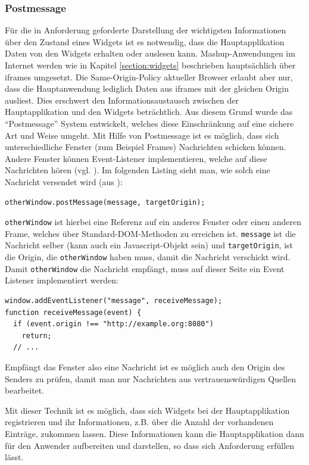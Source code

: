\subsubsection*{Postmessage}
Für die in Anforderung  geforderte Darstellung der wichtigsten Informationen über den Zustand eines Widgets ist es notwendig, dass die Hauptapplikation Daten von den Widgets erhalten oder auslesen kann. Mashup-Anwendungen im Internet werden wie in Kapitel \ref{section:widgets} beschrieben hauptsächlich über iframes umgesetzt. Die Same-Origin-Policy aktueller Browser erlaubt aber nur, dass die Hauptanwendung lediglich Daten aus iframes mit der gleichen Origin ausliest. Dies erschwert den Informationsaustausch zwischen der Hauptapplikation und den Widgets beträchtlich. Aus diesem Grund wurde das "`Postmessage"' System entwickelt, welches diese Einschränkung auf eine sichere Art und Weise umgeht. Mit Hilfe von Postmessage ist es möglich, dass sich unterschiedliche Fenster (zum Beispiel Frames) Nachrichten schicken können. Andere Fenster können Event-Listener implementieren, welche auf diese Nachrichten hören (vgl. \cite{MDN2012}). Im folgenden Listing sieht man, wie solch eine Nachricht versendet wird (aus \cite{MDN2012}):
\begin{lstlisting}
otherWindow.postMessage(message, targetOrigin);
\end{lstlisting}
\texttt{otherWindow} ist hierbei eine Referenz auf ein anderes Fenster oder einen anderen Frame, welches über Standard-DOM-Methoden zu erreichen ist. \texttt{message} ist die Nachricht selber (kann auch ein Javascript-Objekt sein) und \texttt{targetOrigin}, ist die Origin, die \texttt{otherWindow} haben muss, damit die Nachricht verschickt wird. Damit \texttt{otherWindow} die Nachricht empfängt, muss auf dieser Seite ein Event Listener implementiert werden:
\begin{lstlisting}
window.addEventListener("message", receiveMessage);
function receiveMessage(event) {
  if (event.origin !== "http://example.org:8080")
    return;
  // ...
\end{lstlisting}
Empfängt das Fenster also eine Nachricht ist es möglich auch den Origin des Senders zu prüfen, damit man nur Nachrichten aus vertrauenswürdigen Quellen bearbeitet.

Mit dieser Technik ist es möglich, dass sich Widgets bei der Hauptapplikation registrieren und ihr Informationen, z.B. über die Anzahl der vorhandenen Einträge, zukommen lassen. Diese Informationen kann die Hauptapplikation dann für den Anwender aufbereiten und darstellen, so dass sich Anforderung  erfüllen lässt.

